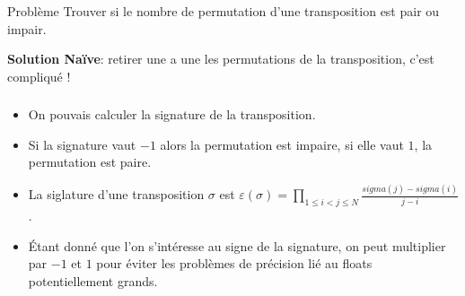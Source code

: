 
\begin{frame}
    \frametitle{\problemtitle}
        \begin{block}
            {Problème} Trouver si le nombre de permutation d'une transposition est pair ou impair.
        \end{block}
        \pause
        \textbf{Solution Naïve}: retirer une a une les permutations de la transposition, c'est compliqué !
\end{frame}

\begin{frame}
    \frametitle{\problemtitle}
    \begin{itemize}
        \item<+-> On pouvais calculer la signature de la transposition.
        \item<+-> Si la signature vaut $-1$ alors la permutation est impaire, si elle vaut $1$, la permutation est paire.
        \item<+-> La siglature d'une transposition $\sigma$ est $\varepsilon(\sigma) = \prod_{1\leq i < j \leq N} \frac{sigma(j)-sigma(i)}{j-i}$.
        \item<+-> Étant donné que l'on s'intéresse au signe de la signature, on peut multiplier par $-1$ et $1$ pour éviter les problèmes de précision lié au floats potentiellement grands.
    \end{itemize}
\end{frame}